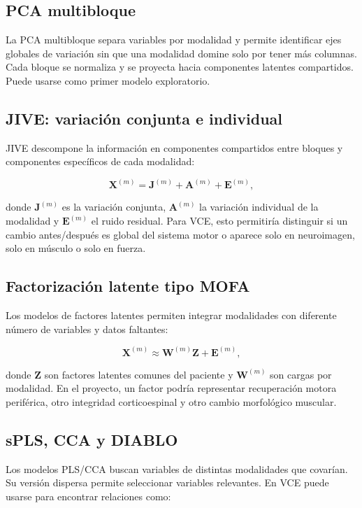 \documentclass[conference]{IEEEtran}
\begin{document}
\subsection{PCA multibloque}
La PCA multibloque separa variables por modalidad y permite identificar ejes globales de variación sin que una modalidad domine solo por tener más columnas. Cada bloque se normaliza y se proyecta hacia componentes latentes compartidos. Puede usarse como primer modelo exploratorio.

\subsection{JIVE: variación conjunta e individual}
JIVE descompone la información en componentes compartidos entre bloques y componentes específicos de cada modalidad:

\begin{equation}
\mathbf{X}^{(m)} = \mathbf{J}^{(m)} + \mathbf{A}^{(m)} + \mathbf{E}^{(m)},
\end{equation}

donde $\mathbf{J}^{(m)}$ es la variación conjunta, $\mathbf{A}^{(m)}$ la variación individual de la modalidad y $\mathbf{E}^{(m)}$ el ruido residual. Para VCE, esto permitiría distinguir si un cambio antes/después es global del sistema motor o aparece solo en neuroimagen, solo en músculo o solo en fuerza.

\subsection{Factorización latente tipo MOFA}
Los modelos de factores latentes permiten integrar modalidades con diferente número de variables y datos faltantes:

\begin{equation}
\mathbf{X}^{(m)} \approx \mathbf{W}^{(m)}\mathbf{Z} + \mathbf{E}^{(m)},
\end{equation}

donde $\mathbf{Z}$ son factores latentes comunes del paciente y $\mathbf{W}^{(m)}$ son cargas por modalidad. En el proyecto, un factor podría representar recuperación motora periférica, otro integridad corticoespinal y otro cambio morfológico muscular.

\subsection{sPLS, CCA y DIABLO}
Los modelos PLS/CCA buscan variables de distintas modalidades que covarían. Su versión dispersa permite seleccionar variables relevantes. En VCE puede usarse para encontrar relaciones como:
\end{document}
